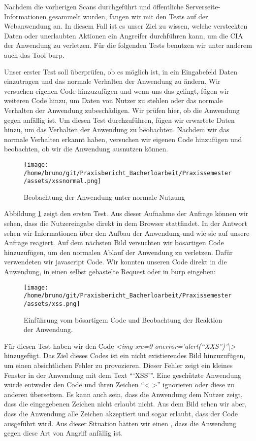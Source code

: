 Nachdem die vorherigen Scans durchgeführt und öffentliche Serverseite-Informationen gesammelt wurden, fangen wir mit den Tests auf der Webanwendung an. In diesem Fall ist es unser Ziel zu wissen, welche versteckten Daten oder unerlaubten Aktionen ein Angreifer durchführen kann, um die \gls{CIA} der Anwendung zu verletzen. Für die folgenden Tests benutzen wir unter anderem auch das Tool \gls{burp}.

Unser erster Test soll überprüfen, ob es möglich ist, in ein Eingabefeld Daten einzutragen und das normale Verhalten der Anwendung zu ändern. Wir versuchen eigenen Code hinzuzufügen und wenn uns das gelingt, fügen wir weiteren Code hinzu, um Daten von Nutzer zu stehlen oder das normale Verhalten der Anwendung zubeschädigen. Wir prüfen hier, ob die Anwendung gegen  anfällig ist. Um diesen Test durchzuführen, fügen wir erwartete Daten hinzu, um das Verhalten der Anwendung zu beobachten. Nachdem wir das normale Verhalten erkannt haben, versuchen wir eigenen Code hinzufügen und beobachten, ob wir die Anwendung ausnutzen können. 

\begin{figure}[H]
    \centering
    \texttt{[image: /home/bruno/git/Praxisbericht\_Bacherloarbeit/Praxissemester/assets/xssnormal.png]}
    \caption{Beobachtung der Anwendung unter normale Nutzung}
    \label{fig:xssnormal}
    \centering
\end{figure}

Abbildung \ref{fig:xssnormal} zeigt den ersten Test. Aus dieser Aufnahme der Anfrage können wir sehen, dass die Nutzereingabe direkt in dem Browser stattfindet. In der Antwort sehen wir Informationen über den Aufbau der Anwendung und wie sie auf unsere Anfrage reagiert. Auf dem nächsten Bild versuchten wir bösartigen Code hinzuzufügen, um den normalen Ablauf der Anwendung zu verletzen. Dafür verwendeten wir \gls{javascript} Code. Wir konnten unseren Code direkt in die Anwendung, in einen selbst gebastelte Request oder in \gls{burp} eingeben:

\begin{figure}[H]
    \centering
    \texttt{[image: /home/bruno/git/Praxisbericht\_Bacherloarbeit/Praxissemester/assets/xss.png]}
    \caption{Einführung vom bösartigem Code und Beobachtung der Reaktion der Anwendung.}
    \label{fig:xssexecuted}
    \centering
\end{figure}

Für diesen Test haben wir den Code \textit{<img src=0 onerror='alert(``XXS'')'\textbackslash>} hinzugefügt. Das Ziel dieses Codes ist ein nicht existierendes Bild hinzuzufügen, um einen absichtlichen Fehler zu provozieren. Dieser Fehler zeigt ein kleines Fenster in der Anwendung mit dem Text ```XSS'''. Eine geschützte Anwendung würde entweder den Code und ihren Zeichen ``< >'' ignorieren oder diese zu anderen übersetzen. Es kann auch sein, dass die Anwendung dem Nutzer zeigt, dass die eingegebenen Zeichen nicht erlaubt nicht. Aus dem Bild sehen wir aber, dass die Anwendung alle Zeichen akzeptiert und sogar erlaubt, dass der Code ausgeführt wird. Aus dieser Situation hätten wir einen , dass die Anwendung gegen diese Art von Angriff anfällig ist.



